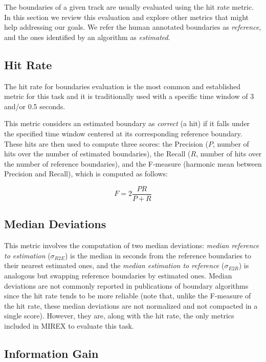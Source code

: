 \documentclass{article}
\begin{document}
The boundaries of a given track are usually evaluated using the hit rate metric.
In this section we review this evaluation and explore other metrics that might help addressing our goals.
We refer the human annotated boundaries as \emph{reference}, and the ones identified by an algorithm as \emph{estimated}.

\subsection{Hit Rate}\label{subsec:hitrate}

The hit rate for boundaries evaluation is the most common and established metric for this task and it is traditionally used with a specific time window of 3 and/or 0.5 seconds\cite{Ong2005}. 

This metric considers an estimated boundary as \emph{correct} (a hit) if it falls under the specified time window centered at its corresponding reference boundary.
These hits are then used to compute three scores: the Precision ($P$, number of hits over the number of estimated boundaries), the Recall ($R$, number of hits over the number of reference boundaries), and the F-measure (harmonic mean between Precision and Recall), which is computed as follows:

\begin{equation}
  F = 2 \frac{P R}{P + R}
\end{equation}

\subsection{Median Deviations}

This metric involves the computation of two median deviations: \emph{median reference to estimation} ($\sigma_{R2E}$) is the median in seconds from the reference boundaries to their nearest estimated ones, and the \emph{median estimation to reference} ($\sigma_{E2R}$) is analogous but swapping reference boundaries by estimated ones\cite{Pampalk}.
Median deviations are not commonly reported in publications of boundary algorithms since the hit rate tends to be more reliable (note that, unlike the F-measure of the hit rate, these median deviations are not normalized and not compacted in a single score).
However, they are, along with the hit rate, the only metrics included in MIREX to evaluate this task.

\subsection{Information Gain}
\end{document}
